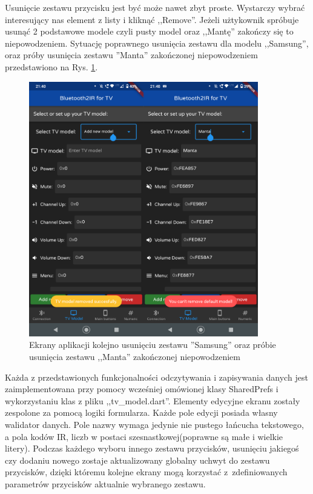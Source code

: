 \documentclass[12pt,twoside]{article}
\begin{document}
Usunięcie zestawu przycisku jest być może nawet zbyt proste. Wystarczy wybrać interesujący nas element z listy i kliknąć ,,Remove''. Jeżeli użtykownik spróbuje usunąć 2 podstawowe modele czyli pusty model oraz ,,Mantę'' zakończy się to niepowodzeniem. Sytuację poprawnego usunięcia zestawu dla modelu ,,Samsung'', oraz próby usunięcia zestawu ''Manta'' zakończonej niepowodzeniem przedstawiono na Rys. \ref*{Fig:removingSamsung}.

\begin{figure}[ht]
   \centering
   \includegraphics[width=10cm]{images/removingSamsung.png}
   \caption{Ekrany aplikacji kolejno usunięciu zestawu ''Samsung'' oraz próbie usunięcia zestawu ,,Manta'' zakończonej niepowodzeniem}
   \label{Fig:removingSamsung}
\end{figure}

Każda z przedstawionych funkcjonalności odczytywania i zapisywania danych jest zaimplementowana przy pomocy wcześniej omówionej klasy SharedPrefs i wykorzystaniu klas z pliku ,,tv\_model.dart''. Elementy edycyjne ekranu zostały zespolone za pomocą logiki formularza. Każde pole edycji posiada własny walidator danych. Pole nazwy wymaga jedynie nie pustego łańcucha tekstowego, a pola kodów IR, liczb w postaci szesnastkowej(poprawne są małe i wielkie litery). Podczas każdego wyboru innego zestawu przycisków, usunięciu jakiegoś czy dodaniu nowego zostaje aktualizowany globalny uchwyt do zestawu przycisków, dzięki któremu kolejne ekrany mogą korzystać z~zdefiniowanych parametrów przycisków aktualnie wybranego zestawu.
\end{document}
